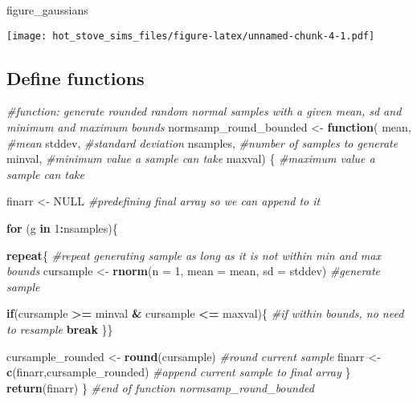 \documentclass[
]{article}
\newenvironment{Shaded}{\begin{snugshade}}{\end{snugshade}}
\newcommand{\AttributeTok}[1]{\textcolor[rgb]{0.13,0.29,0.53}{#1}}
\newcommand{\CommentTok}[1]{\textcolor[rgb]{0.56,0.35,0.01}{\textit{#1}}}
\newcommand{\ConstantTok}[1]{\textcolor[rgb]{0.56,0.35,0.01}{#1}}
\newcommand{\ControlFlowTok}[1]{\textcolor[rgb]{0.13,0.29,0.53}{\textbf{#1}}}
\newcommand{\DecValTok}[1]{\textcolor[rgb]{0.00,0.00,0.81}{#1}}
\newcommand{\FunctionTok}[1]{\textcolor[rgb]{0.13,0.29,0.53}{\textbf{#1}}}
\newcommand{\NormalTok}[1]{#1}
\newcommand{\OtherTok}[1]{\textcolor[rgb]{0.56,0.35,0.01}{#1}}
\newcommand{\SpecialCharTok}[1]{\textcolor[rgb]{0.81,0.36,0.00}{\textbf{#1}}}
\begin{document}
\begin{Shaded}
\begin{Highlighting}[]
\NormalTok{figure\_gaussians}
\end{Highlighting}
\end{Shaded}

\texttt{[image: hot\_stove\_sims\_files/figure-latex/unnamed-chunk-4-1.pdf]}

\subsection{Define functions}\label{define-functions}

\begin{Shaded}
\begin{Highlighting}[]
\CommentTok{\#function: generate rounded random normal samples with a given mean, sd and minimum and maximum bounds}
\NormalTok{normsamp\_round\_bounded }\OtherTok{\textless{}{-}} \ControlFlowTok{function}\NormalTok{(}
\NormalTok{    mean, }\CommentTok{\#mean}
\NormalTok{    stddev, }\CommentTok{\#standard deviation}
\NormalTok{    nsamples, }\CommentTok{\#number of samples to generate}
\NormalTok{    minval, }\CommentTok{\#minimum value a sample can take}
\NormalTok{    maxval) \{ }\CommentTok{\#maximum value a sample can take}
  
\NormalTok{  finarr }\OtherTok{\textless{}{-}} \ConstantTok{NULL} \CommentTok{\#predefining final array so we can append to it}
  
  \ControlFlowTok{for}\NormalTok{ (g }\ControlFlowTok{in} \DecValTok{1}\SpecialCharTok{:}\NormalTok{nsamples)\{}
    
    \ControlFlowTok{repeat}\NormalTok{\{ }\CommentTok{\#repeat generating sample as long as it is not within min and max bounds}
\NormalTok{      cursample }\OtherTok{\textless{}{-}} \FunctionTok{rnorm}\NormalTok{(}\AttributeTok{n =} \DecValTok{1}\NormalTok{, }\AttributeTok{mean =}\NormalTok{ mean, }\AttributeTok{sd =}\NormalTok{ stddev) }\CommentTok{\#generate sample}
      
      \ControlFlowTok{if}\NormalTok{(cursample }\SpecialCharTok{\textgreater{}=}\NormalTok{ minval }\SpecialCharTok{\&}\NormalTok{ cursample }\SpecialCharTok{\textless{}=}\NormalTok{ maxval)\{ }\CommentTok{\#if within bounds, no need to resample}
        \ControlFlowTok{break}
\NormalTok{      \}\}}
    
\NormalTok{    cursample\_rounded }\OtherTok{\textless{}{-}} \FunctionTok{round}\NormalTok{(cursample) }\CommentTok{\#round current sample}
\NormalTok{    finarr }\OtherTok{\textless{}{-}} \FunctionTok{c}\NormalTok{(finarr,cursample\_rounded) }\CommentTok{\#append current sample to final array}
\NormalTok{  \}}
  \FunctionTok{return}\NormalTok{(finarr)}
\NormalTok{\} }\CommentTok{\#end of function normsamp\_round\_bounded}
\end{Highlighting}
\end{Shaded}
\end{document}
